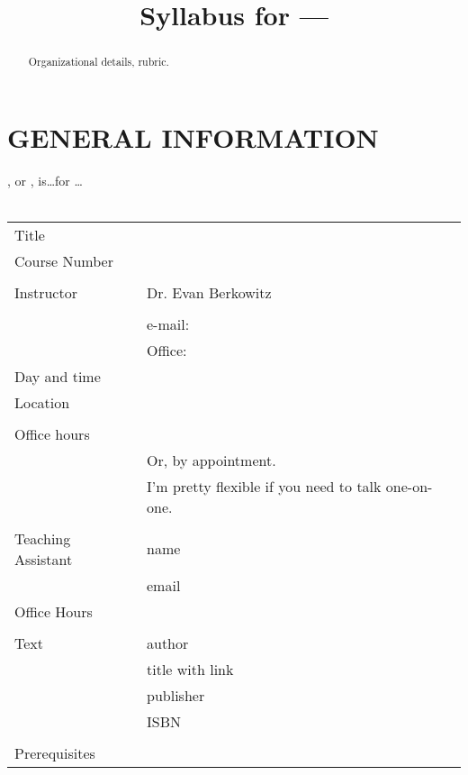 
\providecommand{\repositoryInformationSetup}{} %
\repositoryInformationSetup




\title{Syllabus for \class --- \classTitle}
\contact
\date{\semester}

\begin{abstract}
	Organizational details, rubric.
\end{abstract}

\maketitle

\section*{GENERAL INFORMATION}

\classTitle, or \class, is\ldots for \ldots
\\
\\
\begin{tabular}{p{}p{}}%
	Title			&	\classTitle
	\\
	Course Number	&	\class
	\\
	\\
	Instructor		&	Dr. Evan Berkowitz	\\
	\\
					&	e-mail: \href{mailto:}{} \\
					&	Office: 
	\\
	Day and time	&	\\	
	Location		&	\\
	\\
	Office hours	&	\\
					&	Or, by appointment. \\
					&	I'm pretty flexible if you need to talk one-on-one. \\
	\\

	Teaching Assistant
					&	name \\
					&	email \\
	Office Hours	&	\\
	\\

	Text			&	author \\
					&	title with link \\
					&	publisher \\
					&	ISBN \\
	\\
	Prerequisites	&	
\end{tabular}


